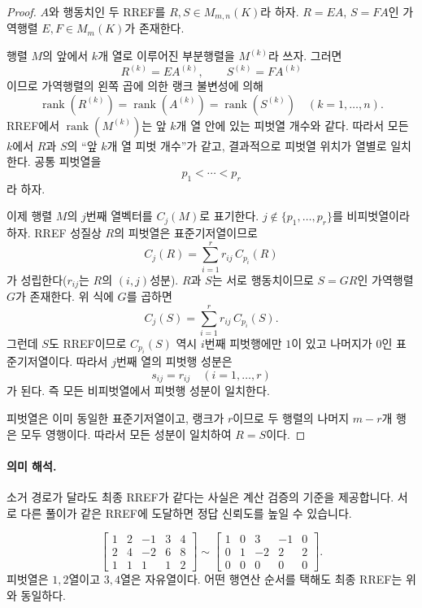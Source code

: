 \begin{proof}
$A$와 행동치인 두 RREF를 $R,S\in M_{m,n}(K)$라 하자. $R=EA$, $S=FA$인 가역행렬 $E,F\in M_m(K)$가 존재한다.

행렬 $M$의 앞에서 $k$개 열로 이루어진 부분행렬을 $M^{(k)}$라 쓰자. 그러면
\[
R^{(k)}=E A^{(k)},\qquad S^{(k)}=F A^{(k)}
\]
이므로 가역행렬의 왼쪽 곱에 의한 랭크 불변성에 의해
\[
\operatorname{rank}(R^{(k)})=\operatorname{rank}(A^{(k)})=\operatorname{rank}(S^{(k)})
\quad (k=1,\dots,n).
\]
RREF에서 $\operatorname{rank}(M^{(k)})$는 앞 $k$개 열 안에 있는 피벗열 개수와 같다. 따라서 모든 $k$에서 $R$과 $S$의 ``앞 $k$개 열 피벗 개수''가 같고, 결과적으로 피벗열 위치가 열별로 일치한다. 공통 피벗열을
\[
p_1<\cdots<p_r
\]
라 하자.

이제 행렬 $M$의 $j$번째 열벡터를 $C_j(M)$로 표기한다. $j\notin\{p_1,\dots,p_r\}$를 비피벗열이라 하자. RREF 성질상 $R$의 피벗열은 표준기저열이므로
\[
C_j(R)=\sum_{i=1}^r r_{ij}\,C_{p_i}(R)
\]
가 성립한다($r_{ij}$는 $R$의 $(i,j)$성분). $R$과 $S$는 서로 행동치이므로 $S=GR$인 가역행렬 $G$가 존재한다. 위 식에 $G$를 곱하면
\[
C_j(S)=\sum_{i=1}^r r_{ij}\,C_{p_i}(S).
\]
그런데 $S$도 RREF이므로 $C_{p_i}(S)$ 역시 $i$번째 피벗행에만 $1$이 있고 나머지가 $0$인 표준기저열이다. 따라서 $j$번째 열의 피벗행 성분은
\[
s_{ij}=r_{ij}\quad (i=1,\dots,r)
\]
가 된다. 즉 모든 비피벗열에서 피벗행 성분이 일치한다.

피벗열은 이미 동일한 표준기저열이고, 랭크가 $r$이므로 두 행렬의 나머지 $m-r$개 행은 모두 영행이다. 따라서 모든 성분이 일치하여 $R=S$이다.
\end{proof}

\paragraph{의미 해석.}
소거 경로가 달라도 최종 RREF가 같다는 사실은 계산 검증의 기준을 제공합니다. 서로 다른 풀이가 같은 RREF에 도달하면 정답 신뢰도를 높일 수 있습니다.

\begin{example}
\[
\left[
\begin{array}{cccc|c}
1&2&-1&3&4\\
2&4&-2&6&8\\
1&1&1&1&2
\end{array}
\right]
\sim
\left[
\begin{array}{cccc|c}
1&0&3&-1&0\\
0&1&-2&2&2\\
0&0&0&0&0
\end{array}
\right].
\]
피벗열은 $1,2$열이고 $3,4$열은 자유열이다. 어떤 행연산 순서를 택해도 최종 RREF는 위와 동일하다.
\end{example}

